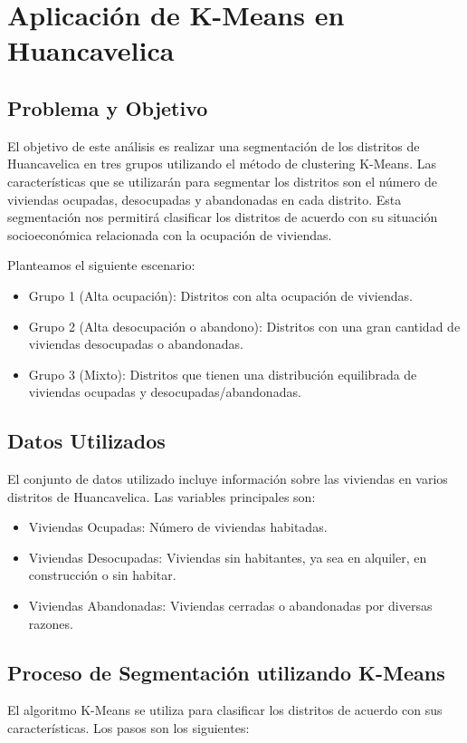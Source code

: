 \documentclass[12pt]{book}
\begin{document}
	
	
	\section{Aplicación de K-Means en Huancavelica}
	\subsection{Problema y Objetivo}
	El objetivo de este análisis es realizar una segmentación de los distritos de Huancavelica en tres grupos utilizando el método de clustering K-Means. Las características que se utilizarán para segmentar los distritos son el número de viviendas ocupadas, desocupadas y abandonadas en cada distrito. Esta segmentación nos permitirá clasificar los distritos de acuerdo con su situación socioeconómica relacionada con la ocupación de viviendas.
	
	Planteamos el siguiente escenario:
	\begin{itemize}
		\item Grupo 1 (Alta ocupación): Distritos con alta ocupación de viviendas.
		\item Grupo 2 (Alta desocupación o abandono): Distritos con una gran cantidad de viviendas desocupadas o abandonadas.
		\item Grupo 3 (Mixto): Distritos que tienen una distribución equilibrada de viviendas ocupadas y desocupadas/abandonadas.
	\end{itemize}
	
	\subsection{Datos Utilizados}
	El conjunto de datos utilizado incluye información sobre las viviendas en varios distritos de Huancavelica. Las variables principales son:
	\begin{itemize}
		\item Viviendas Ocupadas: Número de viviendas habitadas.
		\item Viviendas Desocupadas: Viviendas sin habitantes, ya sea en alquiler, en construcción o sin habitar.
		\item Viviendas Abandonadas: Viviendas cerradas o abandonadas por diversas razones.
	\end{itemize}
	
	
	
	\subsection{Proceso de Segmentación utilizando K-Means}
	El algoritmo K-Means se utiliza para clasificar los distritos de acuerdo con sus características. Los pasos son los siguientes:
	
\end{document}
